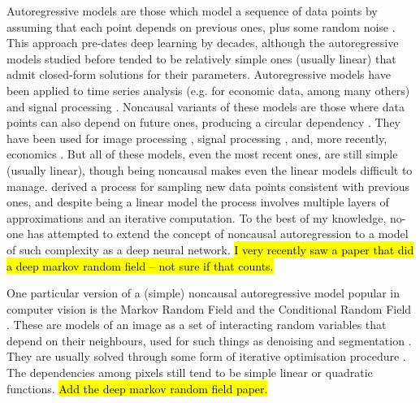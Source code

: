 \documentclass[11pt, a4paper, openany]{book}
\begin{document}
Autoregressive models are those which model a sequence of data points by assuming that each point depends on previous ones, plus some random noise \citep{autoregressive1}. This approach pre-dates deep learning by decades, although the autoregressive models studied before tended to be relatively simple ones (usually linear) that admit closed-form solutions for their parameters. Autoregressive models have been applied to time series analysis (e.g. for economic data, among many others) and signal processing \citep{timeseries}. Noncausal variants of these models are those where data points can also depend on future ones, producing a circular dependency \citep{noncausallikelihood}. They have been used for image processing \citep{noncausalimage1,noncausalimage2}, signal processing \citep{noncausalsignal}, and, more recently, economics \citep{noncausaleco1,noncausaleco2}. But all of these models, even the most recent ones, are still simple (usually linear), though being noncausal makes even the linear models difficult to manage. \citet{noncausaleco2} derived a process for sampling new data points consistent with previous ones, and despite being a linear model the process involves multiple layers of approximations and an iterative computation. To the best of my knowledge, no-one has attempted to extend the concept of noncausal autoregression to a model of such complexity as a deep neural network. \hl{I very recently saw a paper that did a deep markov random field -- not sure if that counts.}

One particular version of a (simple) noncausal autoregressive model popular in computer vision is the Markov Random Field \citep{mrf1,mrf2} and the Conditional Random Field \citep{crf1,crf2}. These are models of an image as a set of interacting random variables that depend on their neighbours, used for such things as denoising and segmentation \citep{mrfuse1,mrfuse2}. They are usually solved through some form of iterative optimisation procedure \citep{mrflearning1,mrflearning2}. The dependencies among pixels still tend to be simple linear or quadratic functions. \hl{Add the deep markov random field paper.}
\end{document}
